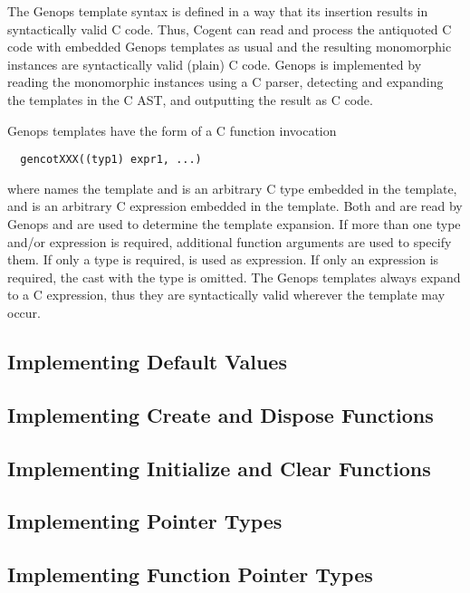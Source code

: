 The Genops template syntax is defined in a way that its insertion results in syntactically valid C code. Thus, 
Cogent can read and process the antiquoted C code with embedded Genops templates as usual and the resulting 
monomorphic instances are syntactically valid (plain) C code. Genops is implemented by reading the monomorphic 
instances using a C parser, detecting and expanding the templates in the C AST, and outputting the result as C code.

Genops templates have the form of a C function invocation
\begin{verbatim}
  gencotXXX((typ1) expr1, ...)
\end{verbatim}
where  names the template and  is an arbitrary C type embedded in the template, and 
is an arbitrary C expression embedded in the template. Both  and  are read by Genops and are 
used to determine the template expansion. If more than one type and/or expression is required, additional function
arguments are used to specify them. If only a type is required,  is used as expression. If only an expression
is required, the cast with the type is omitted. The Genops templates always expand to a C expression, thus they 
are syntactically valid wherever the template may occur.

\subsection{Implementing Default Values}
\label{impl-operations-default}

\subsection{Implementing Create and Dispose Functions}
\label{design-operations-create}

\subsection{Implementing Initialize and Clear Functions}
\label{design-operations-init}

\subsection{Implementing Pointer Types}
\label{impl-operations-pointer}

\subsection{Implementing Function Pointer Types}
\label{impl-operations-function}

